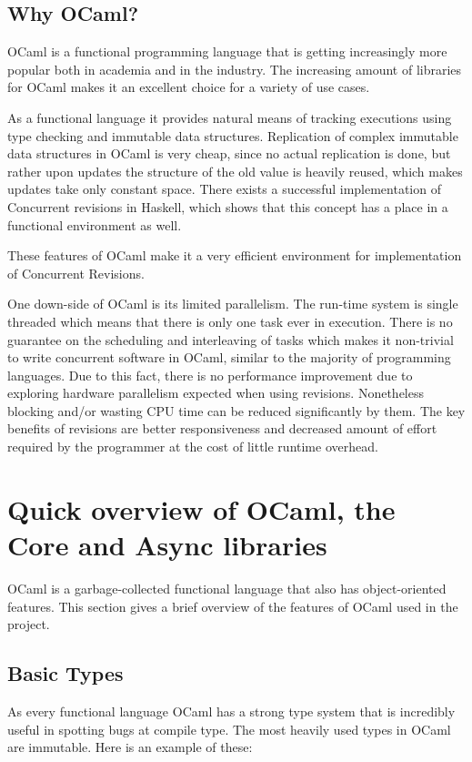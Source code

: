 \documentclass[12pt,twoside,notitlepage]{report}
\begin{document}
\subsection{Why OCaml?}

OCaml is a functional programming language that is getting increasingly more popular both in academia and in the industry. The increasing amount of libraries for OCaml makes it an excellent choice for a variety of use cases. 

As a functional language it provides natural means of tracking executions using type checking and immutable data structures. Replication of complex immutable data structures in OCaml is very cheap, since no actual replication is done, but rather upon updates the structure of the old value is heavily reused, which makes updates take only constant space.
There exists a successful implementation of Concurrent revisions in Haskell, which shows that this concept has a place in a functional environment as well\cite{haskell}.
 
These features of OCaml make it a very efficient environment for implementation of Concurrent Revisions.

One down-side of OCaml is its limited parallelism. The run-time system is single threaded which means that there is only one task ever in execution. There is no guarantee on the scheduling and interleaving of tasks which makes it non-trivial to write concurrent software in OCaml, similar to the majority of programming languages. Due to this fact, there is no performance improvement due to exploring hardware parallelism expected when using revisions. Nonetheless blocking and/or wasting CPU time can be reduced significantly by them. The key benefits of revisions are better responsiveness and decreased amount of effort required by the programmer at the cost of little runtime overhead.    

\section[Quick overview of OCaml]{Quick overview of OCaml, the Core and Async libraries}
OCaml is a garbage-collected functional language that also has object-oriented features.
This section gives a brief overview of the features of OCaml used in the project.

\subsection{Basic Types}
As every functional language OCaml has a strong type system that is incredibly useful in spotting bugs at compile type. The most heavily used types in OCaml are immutable. Here is an example of these:
\end{document}
